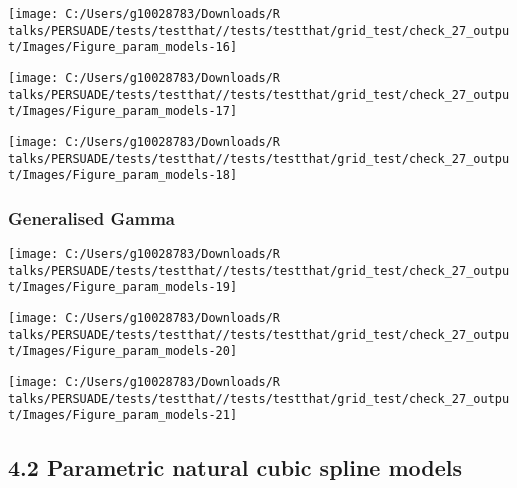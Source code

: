 \documentclass[
]{article}
\begin{document}
\begin{flushleft}\texttt{[image: C:/Users/g10028783/Downloads/R talks/PERSUADE/tests/testthat//tests/testthat/grid\_test/check\_27\_output/Images/Figure\_param\_models-16]} \end{flushleft}

\begin{flushleft}\texttt{[image: C:/Users/g10028783/Downloads/R talks/PERSUADE/tests/testthat//tests/testthat/grid\_test/check\_27\_output/Images/Figure\_param\_models-17]} \end{flushleft}

\begin{flushleft}\texttt{[image: C:/Users/g10028783/Downloads/R talks/PERSUADE/tests/testthat//tests/testthat/grid\_test/check\_27\_output/Images/Figure\_param\_models-18]} \end{flushleft}

\clearpage

\subsubsection{Generalised Gamma}\label{generalised-gamma}

\begin{flushleft}\texttt{[image: C:/Users/g10028783/Downloads/R talks/PERSUADE/tests/testthat//tests/testthat/grid\_test/check\_27\_output/Images/Figure\_param\_models-19]} \end{flushleft}

\begin{flushleft}\texttt{[image: C:/Users/g10028783/Downloads/R talks/PERSUADE/tests/testthat//tests/testthat/grid\_test/check\_27\_output/Images/Figure\_param\_models-20]} \end{flushleft}

\begin{flushleft}\texttt{[image: C:/Users/g10028783/Downloads/R talks/PERSUADE/tests/testthat//tests/testthat/grid\_test/check\_27\_output/Images/Figure\_param\_models-21]} \end{flushleft}

\clearpage

\subsection{4.2 Parametric natural cubic spline
models}\label{parametric-natural-cubic-spline-models}
\end{document}
